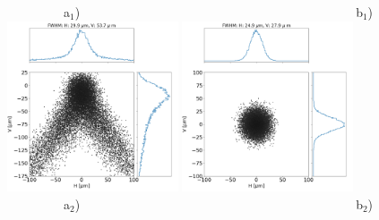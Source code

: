 \documentclass[]{article}
\begin{document}
  

\thispagestyle{empty}


\begin{figure}\label{fig:als}
\flushleft
~~~~~~~~~a$_1$)~~~~~~~~~~~~~~~~~~~~~~~~~~~~~~~~~~~~~~~~~~~~b$_1$) \\
\centering
\includegraphics[width=0.45\textwidth]{figures/als_toroid.png}
\includegraphics[width=0.45\textwidth]{figures/als_diaboloid.png} \\

\flushleft
~~~~~~~~~a$_2$)~~~~~~~~~~~~~~~~~~~~~~~~~~~~~~~~~~~~~~~~~~~~b$_2$) \\
\centering


\end{figure}
\end{document}
